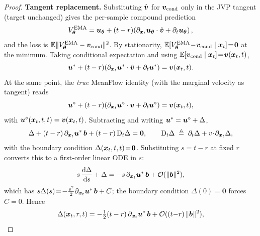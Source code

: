 \begin{appendices}
    \begin{proof}
        \textbf{Tangent replacement.} Substituting $\hat{{\bm{v}}}$ for ${\bm{v}}_{\text{cond}}$ only in the JVP tangent (target unchanged) gives the per-sample compound prediction
        \begin{equation*}
            V_{{\bm{\theta}}}^{\text{EMA}}={\bm{u}}_{{\bm{\theta}}}+(t-r)\!\left(\partial_{{\bm{x}}_{t}}{\bm{u}}_{{\bm{\theta}}}\cdot\hat{{\bm{v}}}+\partial_{t}{\bm{u}}_{{\bm{\theta}}}\right),
        \end{equation*}
        and the loss is $\mathbb{E}\|V_{{\bm{\theta}}}^{\text{EMA}}-{\bm{v}}_{\text{cond}}\|^{2}$. By stationarity, $\mathbb{E}[V_{{\bm{\theta}}}^{\text{EMA}}\!-\!{\bm{v}}_{\text{cond}}\mid{\bm{x}}_{t}]\!=\!\bm{0}$ at the minimum. Taking conditional expectation and using $\mathbb{E}[{\bm{v}}_{\text{cond}}\mid{\bm{x}}_{t}]\!=\!{\bm{v}}({\bm{x}}_{t},t)$,
        \begin{equation*}
            {\bm{u}}^{\ast}+(t-r)\!\left(\partial_{{\bm{x}}_{t}}{\bm{u}}^{\ast}\cdot\hat{{\bm{v}}}+\partial_{t}{\bm{u}}^{\ast}\right)={\bm{v}}({\bm{x}}_{t},t).
        \end{equation*}
        At the same point, the \emph{true} MeanFlow identity (with the marginal velocity as tangent) reads
        \begin{equation*}
            {\bm{u}}^{\diamond}+(t-r)\!\left(\partial_{{\bm{x}}_{t}}{\bm{u}}^{\diamond}\cdot{\bm{v}}+\partial_{t}{\bm{u}}^{\diamond}\right)={\bm{v}}({\bm{x}}_{t},t),
        \end{equation*}
        with ${\bm{u}}^{\diamond}({\bm{x}}_{t},t,t)={\bm{v}}({\bm{x}}_{t},t)$. Subtracting and writing ${\bm{u}}^{\ast}={\bm{u}}^{\diamond}+\Delta$,
        \begin{equation*}
            \Delta+(t-r)\,\partial_{{\bm{x}}_{t}}{\bm{u}}^{\ast}\,{\bm{b}}+(t-r)\,\mathrm{D}_{t}\Delta=\bm{0}, \qquad \mathrm{D}_{t}\Delta\;\triangleq\;\partial_{t}\Delta+v\!\cdot\!\partial_{{\bm{x}}_{t}}\Delta,
        \end{equation*}
        with the boundary condition $\Delta({\bm{x}}_{t},t,t)\!=\!\bm{0}$. Substituting $s\!=\!t{-}r$ at fixed $r$ converts this to a first-order linear ODE in $s$:
        \begin{equation*}
            s\,\frac{\mathrm{d}\Delta}{\mathrm{d}s}+\Delta=-s\,\partial_{{\bm{x}}_{t}}{\bm{u}}^{\ast}\,{\bm{b}}+{\mathcal{O}}(\|{\bm{b}}\|^{2}),
        \end{equation*}
        which has $s\Delta(s)\!=\!-\tfrac{s^{2}}{2}\partial_{{\bm{x}}_{t}}{\bm{u}}^{\ast}\,{\bm{b}}+C$; the boundary condition $\Delta(0)\!=\!\bm{0}$ forces $C\!=\!0$. Hence
        \begin{equation*}
            \Delta({\bm{x}}_{t},r,t)=-\tfrac{1}{2}(t-r)\,\partial_{{\bm{x}}_{t}}{\bm{u}}^{\ast}\,{\bm{b}}+{\mathcal{O}}((t{-}r)\,\|{\bm{b}}\|^{2}),
        \end{equation*}

\end{proof}
\end{appendices}
